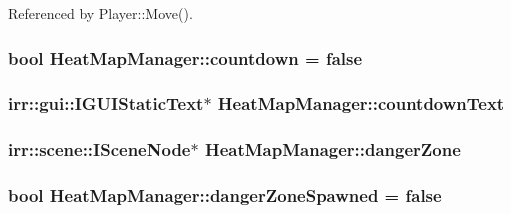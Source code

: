 Referenced by Player\-::\-Move().

\hypertarget{class_heat_map_manager_a659cbc23eff012306ca58bb794d9a9c1}{
\subsubsection[{countdown}]{\setlength{\rightskip}{0pt plus 5cm}bool Heat\-Map\-Manager\-::countdown = false\hspace{0.3cm}{\ttfamily [private]}}}\label{class_heat_map_manager_a659cbc23eff012306ca58bb794d9a9c1}
\hypertarget{class_heat_map_manager_a6cbba801f3d09c86fa63a05180cd181e}{
\subsubsection[{countdown\-Text}]{\setlength{\rightskip}{0pt plus 5cm}irr\-::gui\-::\-I\-G\-U\-I\-Static\-Text$\ast$ Heat\-Map\-Manager\-::countdown\-Text\hspace{0.3cm}{\ttfamily [private]}}}\label{class_heat_map_manager_a6cbba801f3d09c86fa63a05180cd181e}
\hypertarget{class_heat_map_manager_ad5ca224ccce646f0c6fdfce6d48d1c13}{
\subsubsection[{danger\-Zone}]{\setlength{\rightskip}{0pt plus 5cm}irr\-::scene\-::\-I\-Scene\-Node$\ast$ Heat\-Map\-Manager\-::danger\-Zone\hspace{0.3cm}{\ttfamily [private]}}}\label{class_heat_map_manager_ad5ca224ccce646f0c6fdfce6d48d1c13}
\hypertarget{class_heat_map_manager_a9a257b4ffed8cf8c2eaa8c71bf0fa75b}{
\subsubsection[{danger\-Zone\-Spawned}]{\setlength{\rightskip}{0pt plus 5cm}bool Heat\-Map\-Manager\-::danger\-Zone\-Spawned = false}}\label{class_heat_map_manager_a9a257b4ffed8cf8c2eaa8c71bf0fa75b}
